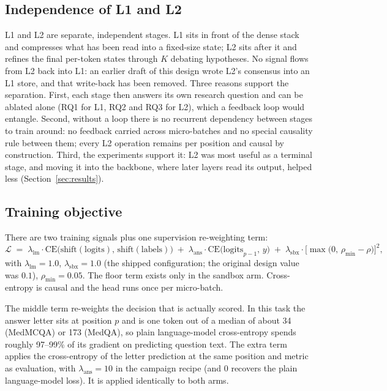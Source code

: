 \documentclass[11pt,a4paper]{article}
\newcommand{\rhodim}{\rho}
\newcommand{\lam}{\lambda}
\theoremstyle{plain}
\theoremstyle{definition}
\theoremstyle{remark}
\begin{document}
\subsection{Independence of L1 and L2}
\label{sec:independence}

\noindent
L1 and L2 are separate, independent stages. L1 sits in front of the dense
stack and compresses what has been read into a fixed-size state; L2 sits
after it and refines the final per-token states through $K$ debating
hypotheses. No signal flows from L2 back into L1: an earlier draft of this
design wrote L2's consensus into an L1 store, and that write-back has been
removed. Three reasons support the separation. First, each stage then answers
its own research question and can be ablated alone (RQ1 for L1, RQ2 and RQ3
for L2), which a feedback loop would entangle. Second, without a loop there is
no recurrent dependency between stages to train around: no feedback carried
across micro-batches and no special causality rule between them; every L2
operation remains per position and causal by construction. Third, the
experiments support it: L2 was most useful as a terminal stage, and moving it
into the backbone, where later layers read its output, helped less
(Section~\ref{sec:results}).

\subsection{Training objective}
\label{sec:loss}

\noindent
There are two training signals plus one supervision re-weighting term:
\begin{equation}
  \mathcal{L} \;=\; \lam_{\mathrm{lm}} \cdot \mathrm{CE}\bigl(\mathrm{shift}(\mathrm{logits}),\, \mathrm{shift}(\mathrm{labels})\bigr)
  \;+\; \lam_{\mathrm{ans}} \cdot \mathrm{CE}\bigl(\mathrm{logits}_{p-1},\, y\bigr)
  \;+\; \lam_{\mathrm{sbx}} \cdot \bigl[\max\bigl(0,\, \rhodim_{\min} - \rhodim\bigr)\bigr]^2,
  \label{eq:loss}
\end{equation}
with $\lam_{\mathrm{lm}} = 1.0$, $\lam_{\mathrm{sbx}} = 1.0$ (the shipped
configuration; the original design value was $0.1$), $\rhodim_{\min} = 0.05$.
The floor term exists only in the sandbox arm. Cross-entropy is causal and the
head runs once per micro-batch.

\noindent
The middle term re-weights the decision that is actually scored. In this task
the answer letter sits at position $p$ and is one token out of a median of
about 34 (MedMCQA) or 173 (MedQA), so plain language-model cross-entropy spends
roughly 97--99\% of its gradient on predicting question text. The extra term
applies the cross-entropy of the letter prediction at the same position and
metric as evaluation, with $\lam_{\mathrm{ans}} = 10$ in the campaign
recipe (and $0$ recovers the plain language-model loss). It is applied
identically to both arms.
\end{document}
